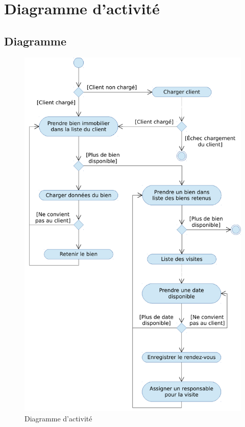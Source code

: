 \chapter{Diagramme d'activité}

\section{Diagramme}

\begin{figure}
  \centering
  \includegraphics[scale=0.67]{IMG/ad}
  \caption{Diagramme d'activité}
  \label{img_ad}
\end{figure}

